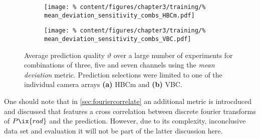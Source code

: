                 \begin{figure}[t]%
                    \centering%
                    \begin{subfigure}{0.47\textwidth}%
                        \texttt{[image: \%
                            content/figures/chapter3/training/\%
                            mean\_deviation\_sensitivity\_combs\_HBCm.pdf]}%
                        \caption{}%
                    \end{subfigure}%
                    \hfill%
                    \begin{subfigure}{0.47\textwidth}%
                        \texttt{[image: \%
                            content/figures/chapter3/training/\%
                            mean\_deviation\_sensitivity\_combs\_VBC.pdf]}%
                        \caption{}%
                    \end{subfigure}%
                    \caption{Average prediction quality $\vartheta$ over a large number of experiments for combinations of three, five and seven channels using the \textit{mean deviation} metric. Prediction selections were limited to one of the individual camera arrays \textbf{(a)} HBCm and \textbf{(b)} VBC.}\label{fig:results_mean_deviation}%
                \end{figure}%
%
                \newline%
                One should note that in \cref{sec:fouriercorrelate} an additional metric is introcduced and discussed that features a cross correlation between discrete fourier transforms of $P\ix{rad}$ and the prediction. However, due to its complexity, inconclusive data set and evaluation it will not be part of the latter discussion here.\\%
